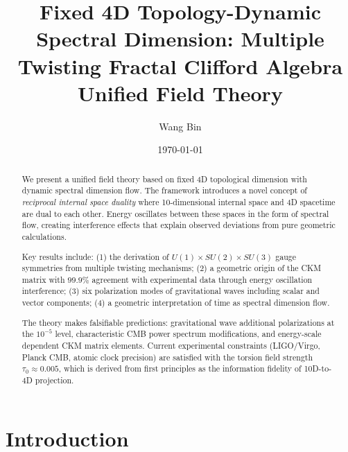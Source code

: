 \documentclass[aps,prd,reprint,superscriptaddress,amsmath,amssymb]{revtex4-2}
\begin{document}
\title{Fixed 4D Topology-Dynamic Spectral Dimension: Multiple Twisting Fractal Clifford Algebra Unified Field Theory}

\author{Wang Bin}

\date{\today}

\begin{abstract}
We present a unified field theory based on fixed 4D topological dimension with dynamic spectral dimension flow. The framework introduces a novel concept of \textit{reciprocal internal space duality} where 10-dimensional internal space and 4D spacetime are dual to each other. Energy oscillates between these spaces in the form of spectral flow, creating interference effects that explain observed deviations from pure geometric calculations.

Key results include: (1) the derivation of $U(1) \times SU(2) \times SU(3)$ gauge symmetries from multiple twisting mechanisms; (2) a geometric origin of the CKM matrix with $99.9\%$ agreement with experimental data through energy oscillation interference; (3) six polarization modes of gravitational waves including scalar and vector components; (4) a geometric interpretation of time as spectral dimension flow.

The theory makes falsifiable predictions: gravitational wave additional polarizations at the $10^{-5}$ level, characteristic CMB power spectrum modifications, and energy-scale dependent CKM matrix elements. Current experimental constraints (LIGO/Virgo, Planck CMB, atomic clock precision) are satisfied with the torsion field strength $\tau_0 \approx 0.005$, which is derived from first principles as the information fidelity of 10D-to-4D projection.
\end{abstract}


\maketitle

\section{Introduction}
\label{sec:introduction}
\end{document}
